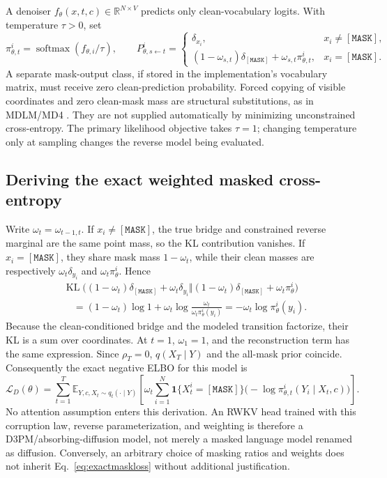 \documentclass{article}
\theoremstyle{remark}\newtheorem{remark}[theorem]{Remark}
\newcommand{\R}{\mathbb R}
\newcommand{\E}{\mathbb E}
\newcommand{\KL}{\operatorname{KL}}
\newcommand{\mask}{\mathtt{[MASK]}}
\begin{document}
A denoiser $f_\theta(x,t,c)\in\R^{N\times V}$ predicts only clean-vocabulary logits. With temperature $\tau>0$, set
\begin{equation}
 \pi_{\theta,t}^i=\operatorname{softmax}(f_{\theta,i}/\tau),\qquad
 P_{\theta,s\leftarrow t}^i=
 \begin{cases}
 \delta_{x_i},&x_i\ne\mask,\\
 (1-\omega_{s,t})\delta_{\mask}+\omega_{s,t}\pi_{\theta,t}^i,&x_i=\mask.
 \end{cases}
 \label{eq:absorbinghead}
\end{equation}
A separate mask-output class, if stored in the implementation's vocabulary matrix, must receive zero clean-prediction probability. Forced copying of visible coordinates and zero clean-mask mass are structural substitutions, as in MDLM/MD4 \cite{mdlm,md4}. They are not supplied automatically by minimizing unconstrained cross-entropy. The primary likelihood objective takes $\tau=1$; changing temperature only at sampling changes the reverse model being evaluated.

\subsection{Deriving the exact weighted masked cross-entropy}
Write $\omega_t=\omega_{t-1,t}$. If $x_i\ne\mask$, the true bridge and constrained reverse marginal are the same point mass, so the KL contribution vanishes. If $x_i=\mask$, they share mask mass $1-\omega_t$, while their clean masses are respectively $\omega_t\delta_{y_i}$ and $\omega_t\pi_\theta^i$. Hence
\begin{align}
 &\KL\bigl((1-\omega_t)\delta_{\mask}+\omega_t\delta_{y_i}
 \Vert(1-\omega_t)\delta_{\mask}+\omega_t\pi_\theta^i\bigr)\nonumber\\
 &\quad=(1-\omega_t)\log1+\omega_t\log\frac{\omega_t}{\omega_t\pi_\theta^i(y_i)}
 =-\omega_t\log\pi_\theta^i(y_i).
 \label{eq:maskklce}
\end{align}
Because the clean-conditioned bridge and the modeled transition factorize, their KL is a sum over coordinates. At $t=1$, $\omega_1=1$, and the reconstruction term has the same expression. Since $\rho_T=0$, $q(X_T\mid Y)$ and the all-mask prior coincide. Consequently the exact negative ELBO for this model is
\begin{equation}
 \boxed{\mathcal L_D(\theta)=
 \sum_{t=1}^T\E_{Y,c,X_t\sim q_t(\cdot\mid Y)}
 \left[\omega_t\sum_{i=1}^N\mathbf1\{X_t^i=\mask\}
 \bigl(-\log\pi_{\theta,t}^i(Y_i\mid X_t,c)\bigr)\right].}
 \label{eq:exactmaskloss}
\end{equation}
No attention assumption enters this derivation. An RWKV head trained with this corruption law, reverse parameterization, and weighting is therefore a D3PM/absorbing-diffusion model, not merely a masked language model renamed as diffusion. Conversely, an arbitrary choice of masking ratios and weights does not inherit Eq.~\eqref{eq:exactmaskloss} without additional justification.
\end{document}

